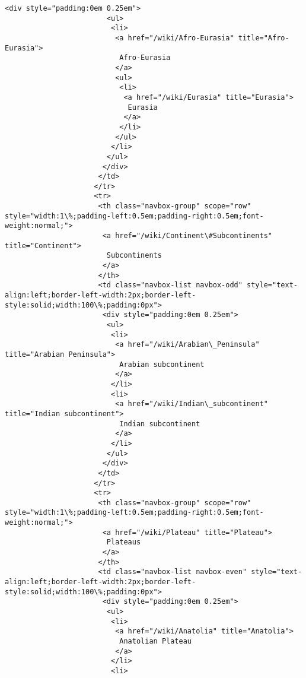 \documentclass[11pt]{article}
\begin{document}
\begin{Verbatim}[commandchars=\\\{\}]
                       <div style="padding:0em 0.25em">
                        <ul>
                         <li>
                          <a href="/wiki/Afro-Eurasia" title="Afro-Eurasia">
                           Afro-Eurasia
                          </a>
                          <ul>
                           <li>
                            <a href="/wiki/Eurasia" title="Eurasia">
                             Eurasia
                            </a>
                           </li>
                          </ul>
                         </li>
                        </ul>
                       </div>
                      </td>
                     </tr>
                     <tr>
                      <th class="navbox-group" scope="row" style="width:1\%;padding-left:0.5em;padding-right:0.5em;font-weight:normal;">
                       <a href="/wiki/Continent\#Subcontinents" title="Continent">
                        Subcontinents
                       </a>
                      </th>
                      <td class="navbox-list navbox-odd" style="text-align:left;border-left-width:2px;border-left-style:solid;width:100\%;padding:0px">
                       <div style="padding:0em 0.25em">
                        <ul>
                         <li>
                          <a href="/wiki/Arabian\_Peninsula" title="Arabian Peninsula">
                           Arabian subcontinent
                          </a>
                         </li>
                         <li>
                          <a href="/wiki/Indian\_subcontinent" title="Indian subcontinent">
                           Indian subcontinent
                          </a>
                         </li>
                        </ul>
                       </div>
                      </td>
                     </tr>
                     <tr>
                      <th class="navbox-group" scope="row" style="width:1\%;padding-left:0.5em;padding-right:0.5em;font-weight:normal;">
                       <a href="/wiki/Plateau" title="Plateau">
                        Plateaus
                       </a>
                      </th>
                      <td class="navbox-list navbox-even" style="text-align:left;border-left-width:2px;border-left-style:solid;width:100\%;padding:0px">
                       <div style="padding:0em 0.25em">
                        <ul>
                         <li>
                          <a href="/wiki/Anatolia" title="Anatolia">
                           Anatolian Plateau
                          </a>
                         </li>
                         <li>

\end{Verbatim}
\end{document}
